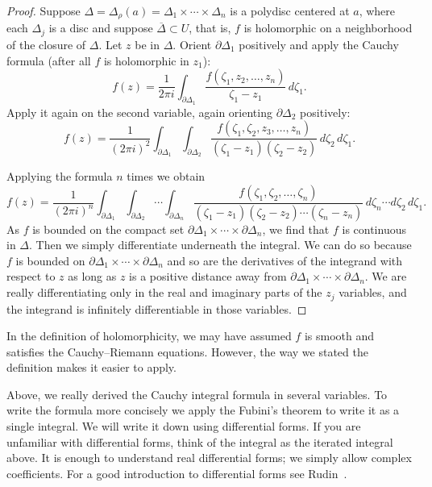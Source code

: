 \documentclass[12pt,openany]{book}
\theoremstyle{plain}
\theoremstyle{remark}
\theoremstyle{definition}
\theoremstyle{exercise}
\theoremstyle{example}
\begin{document}
\begin{proof}
Suppose $\Delta = \Delta_{\rho}(a) = \Delta_1 \times \cdots \times \Delta_n$
is a polydisc centered at $a$, where each $\Delta_j$ is a disc
and suppose $\overline{\Delta} \subset U$, that is, $f$ is holomorphic
on a neighborhood of the closure of $\Delta$.
Let $z$ be in $\Delta$.
Orient $\partial \Delta_1$ positively and
apply the Cauchy formula (after all $f$ is holomorphic in $z_1$):
\begin{equation*}
f(z) =
\frac{1}{2\pi i}
\int_{\partial \Delta_1}
\frac{f(\zeta_1,z_2,\ldots,z_n)}{\zeta_1-z_1}
\,
d \zeta_1 .
\end{equation*}
Apply it again on the second variable, again orienting
$\partial \Delta_2$ positively:
\begin{equation*}
f(z) =
\frac{1}{{(2\pi i)}^2}
\int_{\partial \Delta_1}
\int_{\partial \Delta_2}
\frac{f(\zeta_1,\zeta_2,z_3,\ldots,z_n)}{(\zeta_1-z_1)(\zeta_2-z_2)}
\,
d \zeta_2
\,
d \zeta_1 .
\end{equation*}

Applying the formula $n$ times we obtain
\begin{equation*}
f(z) =
\frac{1}{{(2\pi i)}^n}
\int_{\partial \Delta_1}
\int_{\partial \Delta_2}
\cdots
\int_{\partial \Delta_n}
\frac{f(\zeta_1,\zeta_2,\ldots,\zeta_n)}{(\zeta_1-z_1)(\zeta_2-z_2)\cdots(\zeta_n-z_n)}
\,
d \zeta_n
\cdots
d \zeta_2
\,
d \zeta_1 .
\end{equation*}
As $f$ is bounded on the compact set
$\partial \Delta_1 \times \cdots \times \partial \Delta_n$,
we find that $f$ is continuous in $\Delta$.
Then we simply differentiate underneath the
integral.  We can do so because $f$ is bounded on 
$\partial \Delta_1 \times \cdots \times \partial \Delta_n$
and so are the derivatives of the integrand
with respect to $z$ as long as
$z$ is a positive distance away from
$\partial \Delta_1 \times \cdots \times \partial \Delta_n$.
We are really differentiating only in the real and imaginary
parts of the $z_j$ variables, and the integrand is
infinitely differentiable in those variables.
\end{proof}

In the definition of holomorphicity,
we may have assumed $f$ is smooth and satisfies
the Cauchy--Riemann equations.  However, the way we stated the
definition makes it easier to apply.

Above, we really derived the Cauchy integral formula in several variables.  To
write the formula more concisely we apply the Fubini's theorem to write it as
a single integral.  We will write it down using differential forms.  If you
are unfamiliar with differential forms, think of the integral
as the iterated integral above.
It is enough to understand real differential forms; we simply allow
complex coefficients.
For a good introduction to differential forms
see Rudin~\cite{Rudin:principles}.
\end{document}
